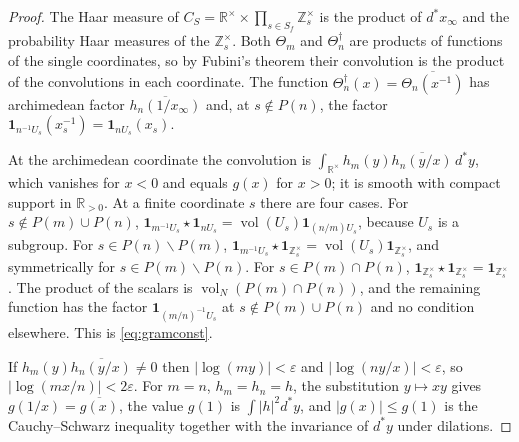 \documentclass[11pt]{amsart}
\theoremstyle{definition}
\newcommand{\R}{\mathbb R}
\newcommand{\Z}{\mathbb Z}
\newcommand{\vol}{\operatorname{vol}}
\begin{document}
\begin{proof}
The Haar measure of
$C_S=\R^\times\times\prod_{s\in S_f}\Z_s^\times$ is the product of
$d^*x_\infty$ and the probability Haar measures of the $\Z_s^\times$. Both
$\Theta_m$ and $\Theta_n^\dagger$ are products of functions of the single
coordinates, so by Fubini's theorem their convolution is the product of the
convolutions in each coordinate. The function
$\Theta_n^\dagger(x)=\overline{\Theta_n(x^{-1})}$ has archimedean factor
$\overline{h_n(1/x_\infty)}$ and, at $s\notin P(n)$, the factor
$\mathbf 1_{n^{-1}U_s}(x_s^{-1})=\mathbf 1_{nU_s}(x_s)$.

At the archimedean coordinate the convolution is
$\int_{\R^\times}h_m(y)\overline{h_n(y/x)}\,d^*y$, which vanishes for $x<0$
and equals $g(x)$ for $x>0$; it is smooth with compact support in $\R_{>0}$.
At a finite coordinate $s$ there are four cases. For
$s\notin P(m)\cup P(n)$,
$\mathbf 1_{m^{-1}U_s}\star\mathbf 1_{nU_s}=\vol(U_s)\mathbf 1_{(n/m)U_s}$,
because $U_s$ is a subgroup. For $s\in P(n)\smallsetminus P(m)$,
$\mathbf 1_{m^{-1}U_s}\star\mathbf 1_{\Z_s^\times}
=\vol(U_s)\mathbf 1_{\Z_s^\times}$, and symmetrically for
$s\in P(m)\smallsetminus P(n)$. For $s\in P(m)\cap P(n)$,
$\mathbf 1_{\Z_s^\times}\star\mathbf 1_{\Z_s^\times}=\mathbf 1_{\Z_s^\times}$.
The product of the scalars is $\vol_N(P(m)\cap P(n))$, and the remaining
function has the factor $\mathbf 1_{(m/n)^{-1}U_s}$ at
$s\notin P(m)\cup P(n)$ and no condition elsewhere. This is
\eqref{eq:gramconst}.

If $h_m(y)\overline{h_n(y/x)}\ne0$ then $|\log(my)|<\varepsilon$ and
$|\log(ny/x)|<\varepsilon$, so $|\log(mx/n)|<2\varepsilon$. For $m=n$,
$h_m=h_n=h$, the substitution $y\mapsto xy$ gives $g(1/x)=\overline{g(x)}$,
the value $g(1)$ is $\int|h|^2d^*y$, and $|g(x)|\le g(1)$ is the
Cauchy--Schwarz inequality together with the invariance of $d^*y$ under
dilations.
\end{proof}
\end{document}
